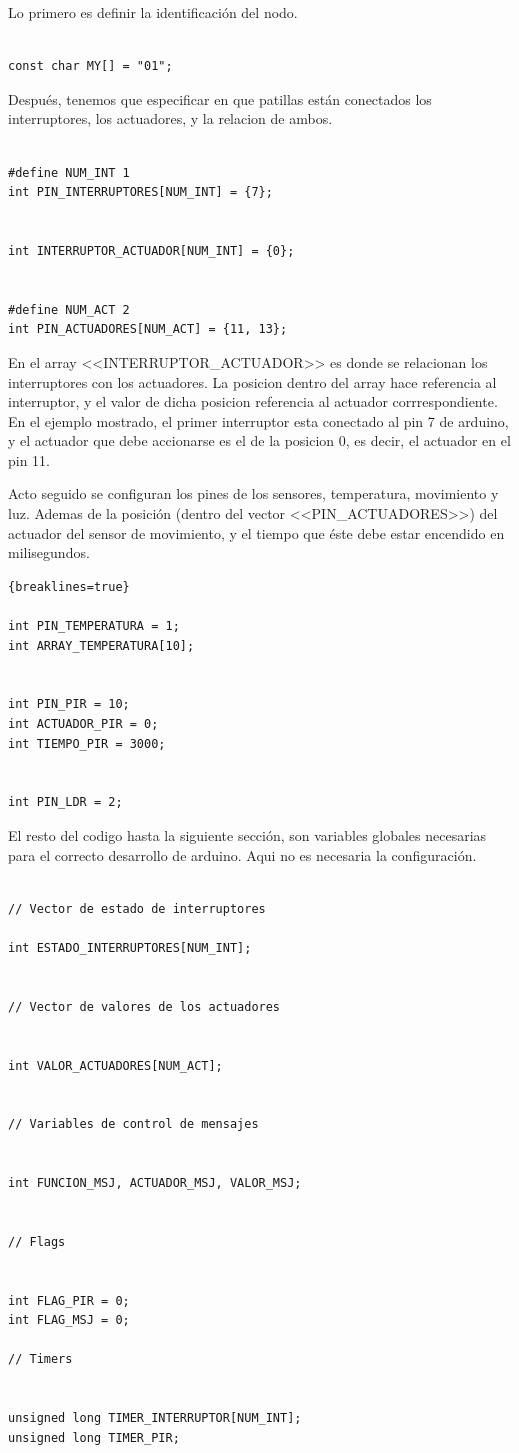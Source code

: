 Lo primero es definir la identificación del nodo.
\begin{lstlisting}

const char MY[] = "01";

\end{lstlisting}

Después, tenemos que especificar en que patillas están conectados los interruptores, los actuadores, y la relacion de ambos.

\begin{lstlisting}

#define NUM_INT 1
int PIN_INTERRUPTORES[NUM_INT] = {7};


int INTERRUPTOR_ACTUADOR[NUM_INT] = {0};


#define NUM_ACT 2
int PIN_ACTUADORES[NUM_ACT] = {11, 13};

\end{lstlisting}

En el array <<INTERRUPTOR\_ACTUADOR>> es donde se relacionan los interruptores con los actuadores. La posicion dentro del array hace referencia al interruptor, y el valor de dicha posicion referencia al actuador corrrespondiente. En el ejemplo mostrado, el primer interruptor esta conectado al pin 7 de arduino, y el actuador que debe accionarse es el de la posicion 0, es decir, el actuador en el pin 11.

Acto seguido se configuran los pines de los sensores, temperatura, movimiento y luz. Ademas de la posición (dentro del vector <<PIN\_ACTUADORES>>) del actuador del sensor de movimiento, y el tiempo que éste debe estar encendido en milisegundos. 

\begin{lstlisting}{breaklines=true}

int PIN_TEMPERATURA = 1;
int ARRAY_TEMPERATURA[10];


int PIN_PIR = 10;
int ACTUADOR_PIR = 0;
int TIEMPO_PIR = 3000;


int PIN_LDR = 2;
\end{lstlisting}

El resto del codigo hasta la siguiente sección, son variables globales necesarias para el correcto desarrollo de arduino. Aqui no es necesaria la configuración.

\begin{lstlisting}

// Vector de estado de interruptores

int ESTADO_INTERRUPTORES[NUM_INT];


// Vector de valores de los actuadores


int VALOR_ACTUADORES[NUM_ACT];


// Variables de control de mensajes


int FUNCION_MSJ, ACTUADOR_MSJ, VALOR_MSJ;


// Flags


int FLAG_PIR = 0;
int FLAG_MSJ = 0;

// Timers


unsigned long TIMER_INTERRUPTOR[NUM_INT];
unsigned long TIMER_PIR;

\end{lstlisting}


